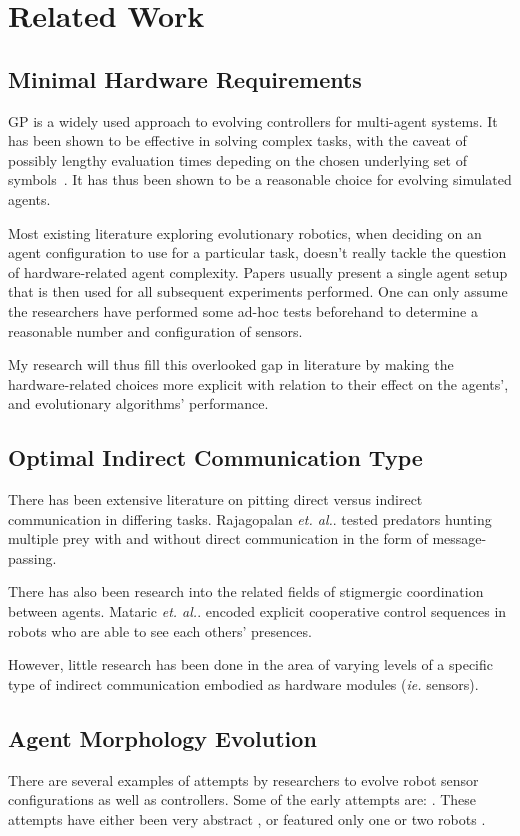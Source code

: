 \documentclass[a4paper,12pt]{article}
\begin{document}
\section{Related Work}

\subsection{Minimal Hardware Requirements}
GP is a widely used approach to evolving controllers for multi-agent systems. It has been shown to be effective in solving complex tasks, with the caveat of possibly lengthy evaluation times depeding on the chosen underlying set of symbols~\cite{gpchallenges,stgp}. It has thus been shown to be a reasonable choice for evolving simulated agents.

Most existing literature exploring evolutionary robotics, when deciding on an agent configuration to use for a particular task, doesn’t really tackle the question of hardware-related agent complexity. Papers usually present a single agent setup that is then used for all subsequent experiments performed\cite{Waibel09, Sims94}. One can only assume the researchers have performed some ad-hoc tests beforehand to determine a reasonable number and configuration of sensors.

My research will thus fill this overlooked gap in literature by making the hardware-related choices more explicit with relation to their effect on the agents’, and evolutionary algorithms’ performance.

\subsection{Optimal Indirect Communication Type}
There has been extensive literature on pitting direct versus indirect communication in differing tasks. Rajagopalan \textit{et. al.}. tested predators hunting multiple prey with and without direct communication in the form of message-passing. \cite{Rajagopalan11}

There has also been research into the related fields of stigmergic coordination between agents. Mataric \textit{et. al.}. encoded explicit cooperative control sequences in robots who are able to see each others’ presences. \cite{Werger99}

However, little research has been done in the area of varying levels of a specific type of indirect communication embodied as hardware modules (\textit{ie.} sensors).


\subsection{Agent Morphology Evolution}
There are several examples of attempts by researchers to evolve robot sensor configurations as well as controllers. Some of the early attempts are: \cite{Sims94,Balakrishnan96,Lee:1996}. These attempts have either been very abstract \cite{Balakrishnan96}, or featured only one or two robots \cite{Sims94}.
\end{document}
